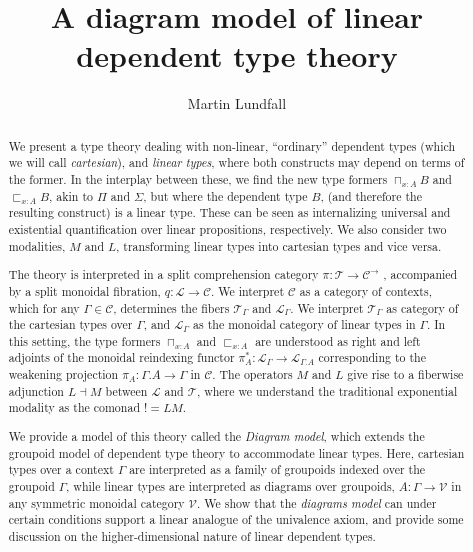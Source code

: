 \documentclass[a4paper,english]{lipics-v2018}
\title{A diagram model of linear dependent type theory}
\author{Martin Lundfall}{Stockholm University}{martin@dapp.org}{}{}%
\begin{document}
\maketitle

\begin{abstract}
We present a type theory dealing with non-linear, ``ordinary'' dependent types (which we will call \textit{cartesian}), and \textit{linear types}, where both constructs may depend on terms of the former. In the interplay between these, we find the new type formers $\sqcap_{x : A}B$ and $\sqsubset_{x : A}B$, akin to $\Pi$ and $\Sigma$, but where the dependent type $B$, (and therefore the resulting construct) is a linear type. These can be seen as internalizing universal and existential quantification over linear propositions, respectively. We also consider two modalities, $M$ and $L$, transforming linear types into cartesian types and vice versa.

The theory is interpreted in a split comprehension category $\pi : \mathcal{T} \to \mathcal{C}^\to$ \cite{jacobs}, accompanied by a split monoidal fibration, $q : \mathcal{L} \to \mathcal{C}$. We interpret $\mathcal{C}$ as a category of contexts, which for any $\Gamma \in \mathcal{C}$, determines the fibers $\mathcal{T}_\Gamma$ and $\mathcal{L}_\Gamma$. We interpret $\mathcal{T}_\Gamma$ as category of the cartesian types over $\Gamma$, and $\mathcal{L}_\Gamma$ as the monoidal category of linear types in $\Gamma$. In this setting, the type formers $\sqcap_{x :A}$ and $\sqsubset_{x : A}$ are understood as right and left adjoints of the monoidal reindexing functor $\pi_A^* : \mathcal{L}_\Gamma \to \mathcal{L}_{\Gamma.A}$ corresponding to the weakening projection $\pi_A : \Gamma.A \to \Gamma$ in $\mathcal{C}$. The operators $M$ and $L$ give rise to a fiberwise adjunction $L \dashv M$ between $\mathcal{L}$ and $\mathcal{T}$, where we understand the traditional exponential modality as the comonad $! = LM$.

We provide a model of this theory called the \textit{Diagram model}, which extends the groupoid model of dependent type theory \cite{hofmann1998} to accommodate linear types. Here, cartesian types over a context $\Gamma$ are interpreted as a family of groupoids indexed over the groupoid $\Gamma$, while linear types are interpreted as diagrams over groupoids, $A : \Gamma \to \mathcal{V}$ in any symmetric monoidal category $\mathcal{V}$. We show that the \textit{diagrams model} can under certain conditions support a linear analogue of the univalence axiom, and provide some discussion on the higher-dimensional nature of linear dependent types.
\end{abstract}
\tableofcontents
\end{document}
